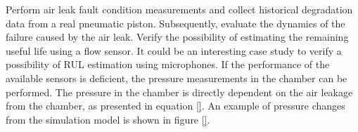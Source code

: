 Perform air leak fault condition measurements and collect historical
degradation data from a real pneumatic piston. Subsequently, evaluate the
dynamics of the failure caused by the air leak. Verify the possibility of
estimating the remaining useful life using a flow sensor. It could be an
interesting case study to verify a possibility of RUL estimation using
microphones. If the performance of the available sensors is deficient, the
pressure measurements in the chamber can be performed. The pressure in the
chamber is directly dependent on the air leakage from the chamber, as
presented in equation \ref{}. An example of pressure changes from the
simulation model is shown in figure \ref{}.

